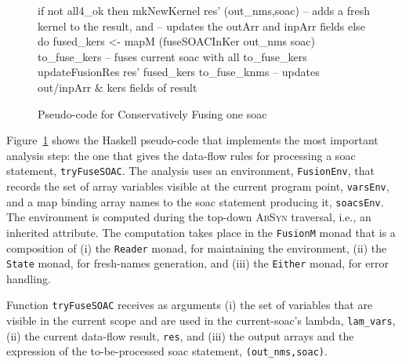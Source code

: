 \documentclass{sigplanconf}  %
\newcommand{\emp}[1]{\textcolor{DikuRed}{ #1}}
\newcommand{\emphh}[1]{\textcolor{CosGreen}{ #1}}
\begin{document}
\begin{figure}[bt]
{\begin{colorcode}
  if not all4_ok then mkNewKernel res' (out_nms,soac)
             -- adds a fresh kernel to the result, and    
             -- updates the outArr and inpArr fields
  else do fused_kers <- mapM (fuseSOACInKer out_nms soac) 
                             to_fuse_kers
          -- fuses current soac with all to_fuse_kers
          updateFusionRes res' fused_kers to_fuse_knms
          -- updates out/inpArr \& kers fields of result
\end{colorcode}
} \vspace{-2ex}
\caption{ Pseudo-code for Conservatively Fusing one {\sc soac} }
\label{fig:FuseOnce}
\end{figure}


Figure~\ref{fig:FuseOnce} shows %
the Haskell pseudo-code that implements the most important 
analysis step: the one that gives the data-flow rules for processing 
a {\sc soac} statement, \emp{\tt tryFuseSOAC}. 
%
The analysis uses an environment, \emphh{\tt FusionEnv}, that records the set 
of array variables visible at the current program point, {\tt varsEnv}, and a 
map binding array names to the {\sc soac} statement producing it, {\tt soacsEnv}. 
The environment is computed during the top-down \textsc{AbSyn} traversal, 
i.e., an inherited attribute.
%
The computation takes place in the \emp{\tt FusionM} monad that is a
composition of (i) the {\tt Reader} monad, for maintaining the environment,
(ii) the {\tt State} monad, for fresh-names generation, and (iii) the 
{\tt Either} monad, for error handling.

Function \emp{\tt tryFuseSOAC} receives as arguments (i) the set of variables
that are visible in the current scope and are used in the current-{\sc soac}'s
lambda, {\tt lam\_vars}, (ii) the current data-flow result, {\tt res}, and
(iii) the output arrays and the expression of the to-be-processed 
{\sc soac} statement, {\tt (out\_nms,soac)}.  
\end{document}
